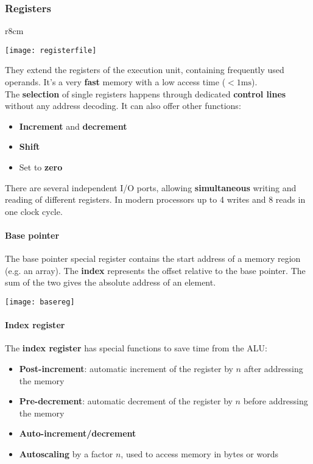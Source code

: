 \subsubsection{Registers}
\begin{wrapfigure}[10]{r}{8cm}
	\vspace{-1cm}
	\begin{center}
		\texttt{[image: registerfile]}
	\end{center}
\end{wrapfigure}
They extend the registers of the execution unit, containing frequently used operands. It's a very \textbf{fast} memory with a low access time ($<1\text{ms}$).\\
The \textbf{selection} of single registers happens through dedicated \textbf{control lines} without any address decoding. It can also offer other functions:
\begin{itemize}
	\item \textbf{Increment} and \textbf{decrement}
	\item \textbf{Shift}
	\item Set to \textbf{zero}
\end{itemize}
There are several independent I/O ports, allowing \textbf{simultaneous} writing and reading of different registers. In modern processors up to 4 writes and 8 reads in one clock cycle.

\paragraph{Base pointer}
The base pointer special register contains the start address of a memory region (e.g. an array). The \textbf{index} represents the offset relative to the base pointer. The sum of the two gives the absolute address of an element.

\begin{center}
	\texttt{[image: basereg]}
\end{center}

\paragraph{Index register}
\noindent The \textbf{index register} has special functions to save time from the ALU:
\begin{itemize}
	\item \textbf{Post-increment}: automatic increment of the register by $n$ after addressing the memory
	\item \textbf{Pre-decrement}: automatic decrement of the register by $n$ before addressing the memory
	\item \textbf{Auto-increment/decrement}
	\item \textbf{Autoscaling} by a factor $n$, used to access memory in bytes or words
\end{itemize}

